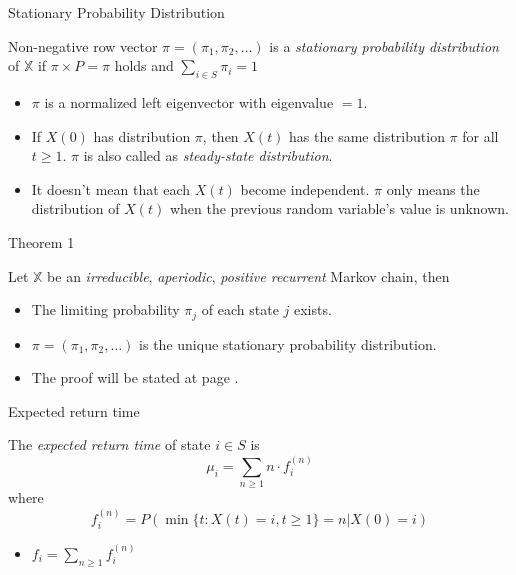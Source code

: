 \documentclass[mathserif]{beamer}
\begin{document}
\begin{frame}{Stationary Probability Distribution}
	\begin{definition}
		Non-negative row vector $\pi = (\pi_1, \pi_2, \ldots)$
		is a \textit{stationary probability distribution} of $\mathbb{X}$
		if $\pi \times P = \pi$ holds and $\sum_{i \in S} \pi_i = 1$
	\end{definition}
	\begin{itemize}
		\item $\pi$ is a normalized left eigenvector with eigenvalue $=1$.
		\item If $X(0)$ has distribution $\pi$, then $X(t)$ has the same distribution $\pi$
			for all $t \geq 1$.
			$\pi$ is also called as \textit{steady-state distribution}.
		\item It doesn't mean that each $X(t)$ become independent.
			$\pi$ only means the distribution of $X(t)$ when the previous random variable's value is unknown.
	\end{itemize}
\end{frame}

\begin{frame}{Theorem 1}
	\begin{theorem}
		Let $\mathbb{X}$ be an \textit{irreducible}, \textit{aperiodic}, \textit{positive recurrent} Markov chain, then
		\begin{itemize}
			\item The limiting probability $\pi_j$ of each state $j$ exists.
			\item $\pi = (\pi_1, \pi_2, \ldots)$ is the unique stationary probability distribution.
		\end{itemize}
	\end{theorem}
	\begin{itemize}
		\item The proof will be stated at page \hyperlink{thm1_proof}{\pageref{thm1_proof}}.
	\end{itemize}
\end{frame}

\begin{frame}{Expected return time}
	\begin{definition}
		The \textit{expected return time} of state $i \in S$ is
		\[
		\mu_i = \sum_{n \geq 1} n \cdot f_i^{(n)}
		\]
		where
		\[
		f_i^{(n)} = P(\min\{t:X(t) = i, t\geq 1\} = n | X(0) = i)
		\]
	\end{definition}
	\begin{itemize}
		\item $f_i = \sum_{n \geq 1} f_i^{(n)}$
	\end{itemize}
\end{frame}
\end{document}
